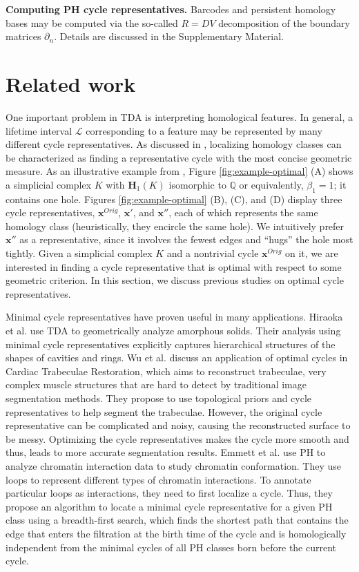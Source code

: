 \documentclass[utf8]{formatting_stuff/frontiersFPHY}
\newcommand{\Homologies}[0]{\mathbf{H}}
\newcommand{\originalrep}{\mathbf{x}^{Orig}}
\newcommand{\optimalrep}{\mathbf{x}}
\newcommand{\persinterval}{\mathcal{L}}
\theoremstyle{plain}
\theoremstyle{definition}
\begin{document}
\noindent \textbf{Computing PH cycle representatives.} Barcodes and persistent homology bases may be computed via the so-called $R = DV$ decomposition \cite{cohen2006vines} of the boundary matrices $\partial_n$. Details are discussed in the Supplementary Material.

 
\section{Related work}\label{problem formulation}


One important problem in TDA is interpreting homological features. In general, a lifetime interval $\persinterval$ corresponding to a feature may be represented by many different cycle representatives. As discussed in \cite{chenquantifying}, localizing homology classes can be characterized as finding a representative cycle with the most concise geometric measure. As an illustrative example from \cite{Escolar2016}, Figure \ref{fig:example-optimal} (A) shows a simplicial complex $K$ with $\Homologies_1(K)$ isomorphic to $\mathbb{Q}$ or equivalently, $\beta_1=1$; it contains one hole.  Figures \ref{fig:example-optimal} (B), (C), and (D) display three cycle representatives, $\originalrep$, $\optimalrep'$, and $\optimalrep''$, each of which represents the same homology class (heuristically, they encircle the same hole). We intuitively prefer $\optimalrep''$ as a representative, since it involves the fewest edges  and ``hugs'' the hole most tightly. Given a simplicial complex $K$ and a nontrivial cycle $\originalrep$ on it, we are interested in finding a cycle representative that is optimal with respect to some geometric criterion. In this section, we discuss previous studies on optimal cycle representatives. 

Minimal cycle representatives have proven  useful in many applications. Hiraoka et al. \cite{Hiraoka7035} use TDA to geometrically analyze amorphous solids. Their analysis using minimal cycle representatives explicitly captures hierarchical structures of the shapes of cavities and rings. Wu et al. \cite{wu} discuss an application of optimal cycles in Cardiac Trabeculae Restoration, which aims to reconstruct trabeculae, very complex muscle structures that are hard to detect by traditional image segmentation methods. They propose to use topological priors and cycle representatives to help segment the trabeculae. However, the original cycle representative can be complicated and noisy, causing the reconstructed surface to be messy. Optimizing the cycle representatives makes the cycle more smooth and thus, leads to more accurate segmentation results. Emmett et al. \cite{emmett2015multiscale} use PH to analyze chromatin interaction data to study chromatin conformation. They use loops to represent different types of chromatin interactions. To annotate particular loops as interactions, they need to first localize a cycle. Thus, they propose an algorithm to locate a minimal cycle representative for a given PH class using a breadth-first search, which finds the shortest path that contains the edge that enters the filtration at the birth time of the cycle and is homologically independent from the minimal cycles of all PH classes born before the current cycle. 
\end{document}
